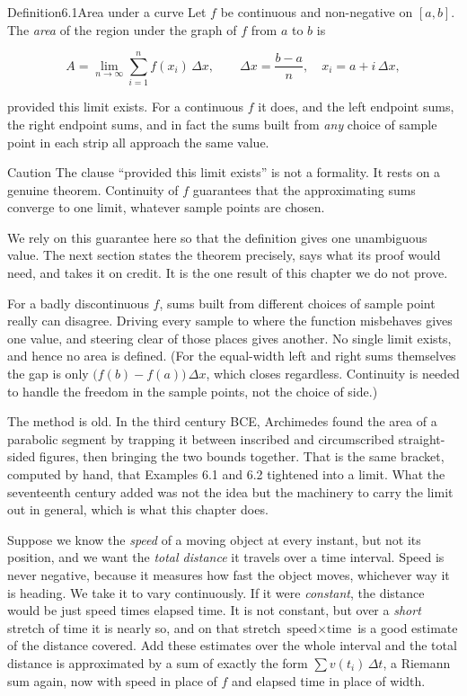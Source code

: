 \documentclass[a4paper,12pt,oneside]{memoir}
\begin{document}
\begin{envdefinition}{Definition}{6.1}{Area under a curve}
Let \(f\) be continuous and non-negative on \([a, b]\). The \emph{area} of the region under the graph of \(f\) from \(a\) to \(b\) is

\[ A = \lim_{n \to \infty} \sum_{i=1}^{n} f(x_{i})\,\Delta x, \qquad \Delta x = \frac{b - a}{n},\quad x_{i} = a + i\,\Delta x, \]

provided this limit exists. For a continuous \(f\) it does, and the left endpoint sums, the right endpoint sums, and in fact the sums built from \emph{any} choice of sample point in each strip all approach the same value.
\end{envdefinition}
\begin{envcaution}{Caution}{}{}
The clause “provided this limit exists” is not a formality. It rests on a genuine theorem. Continuity of \(f\) guarantees that the approximating sums converge to one limit, whatever sample points are chosen.

We rely on this guarantee here so that the definition gives one unambiguous value. The next section states the theorem precisely, says what its proof would need, and takes it on credit. It is the one result of this chapter we do not prove.

For a badly discontinuous \(f\), sums built from different choices of sample point really can disagree. Driving every sample to where the function misbehaves gives one value, and steering clear of those places gives another. No single limit exists, and hence no area is defined. (For the equal-width left and right sums themselves the gap is only \(\bigl(f(b) - f(a)\bigr)\,\Delta x\), which closes regardless. Continuity is needed to handle the freedom in the sample points, not the choice of side.)
\end{envcaution}
The method is old. In the third century BCE, Archimedes found the area of a parabolic segment by trapping it between inscribed and circumscribed straight-sided figures, then bringing the two bounds together. That is the same bracket, computed by hand, that Examples 6.1 and 6.2 tightened into a limit. What the seventeenth century added was not the idea but the machinery to carry the limit out in general, which is what this chapter does.

Suppose we know the \emph{speed} of a moving object at every instant, but not its position, and we want the \emph{total distance} it travels over a time interval. Speed is never negative, because it measures how fast the object moves, whichever way it is heading. We take it to vary continuously. If it were \emph{constant}, the distance would be just speed times elapsed time. It is not constant, but over a \emph{short} stretch of time it is nearly so, and on that stretch \(\text{speed} \times \text{time}\) is a good estimate of the distance covered. Add these estimates over the whole interval and the total distance is approximated by a sum of exactly the form \(\sum v(t_{i})\,\Delta t\), a Riemann sum again, now with speed in place of \(f\) and elapsed time in place of width.
\end{document}
